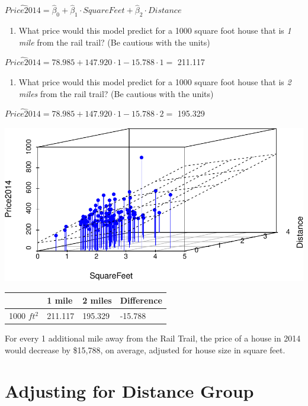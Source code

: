 \documentclass[]{article}
\providecommand{\tightlist}{%
  \setlength{\itemsep}{0pt}\setlength{\parskip}{0pt}}
\begin{document}
\(\widehat{Price2014} = \hat{\beta}_0 + \hat{\beta}_1 \cdot SquareFeet + \hat{\beta}_2 \cdot Distance\)

\begin{enumerate}
\def\labelenumi{\arabic{enumi}.}
\tightlist
\item
  What price would this model predict for a 1000 square foot house that
  is \emph{1 mile} from the rail trail? (Be cautious with the units)
\end{enumerate}

\(\widehat{Price2014} = 78.985 + 147.920 \cdot 1 -15.788 \cdot 1=\)
211.117

\begin{enumerate}
\def\labelenumi{\arabic{enumi}.}
\setcounter{enumi}{1}
\tightlist
\item
  What price would this model predict for a 1000 square foot house that
  is \emph{2 miles} from the rail trail? (Be cautious with the units)
\end{enumerate}

\(\widehat{Price2014} = 78.985 + 147.920 \cdot 1 -15.788 \cdot 2=\)
195.329

\includegraphics{09_InClass_Answers_files/figure-latex/unnamed-chunk-3-1.pdf}
\vspace{0.5 in}

\begin{longtable}[]{@{}llll@{}}
\toprule
& 1 mile & 2 miles & Difference\tabularnewline
\midrule
\endhead
1000 \(ft^2\) & 211.117 & 195.329 & -15.788\tabularnewline
\bottomrule
\end{longtable}

For every 1 additional mile away from the Rail Trail, the price of a
house in 2014 would decrease by \$15,788, on average, adjusted for house
size in square feet.

\newpage

\hypertarget{adjusting-for-distance-group}{%
\section{Adjusting for Distance
Group}\label{adjusting-for-distance-group}}
\end{document}

